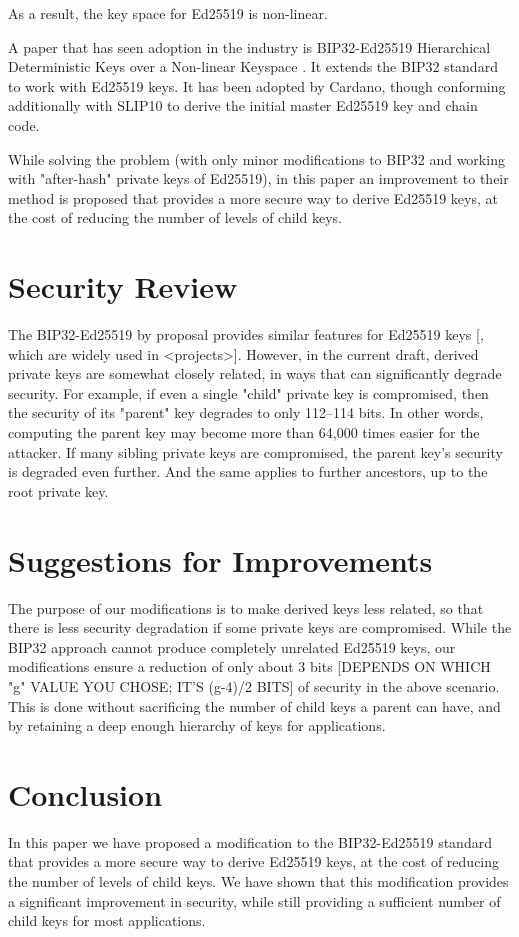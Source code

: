 \documentclass[12pt, a4paper, twocolumn]{article}
\begin{document}
As a result, the key space for Ed25519 is non-linear.

A paper that has seen adoption in the industry is BIP32-Ed25519
Hierarchical Deterministic Keys over a Non-linear Keyspace \cite{BIP32-Ed25519}. It extends the BIP32 standard to work with Ed25519 keys. It has been adopted by Cardano, though conforming additionally with SLIP10 to derive the initial master Ed25519 key and chain code.

While solving the problem (with only minor modifications to BIP32 and working with "after-hash" private keys of Ed25519), in this paper an improvement to their method is proposed that provides a more secure way to derive Ed25519 keys, at the cost of reducing the number of levels of child keys.


\section{Security Review}

The BIP32-Ed25519 by  proposal provides similar features for Ed25519 keys [, which are widely used in <projects>]. However, in the current draft, derived private keys are somewhat closely related, in ways that can significantly degrade security. For example, if even a single "child" private key is compromised, then the security of its "parent" key degrades to only 112--114 bits. In other words, computing the parent key may become more than 64,000 times easier for the attacker. If many sibling private keys are compromised, the parent key's security is degraded even further. And the same applies to further ancestors, up to the root private key.


\section{Suggestions for Improvements}

The purpose of our modifications is to make derived keys less related, so that there is less security degradation if some private keys are compromised. While the BIP32 approach cannot produce completely unrelated Ed25519 keys, our modifications ensure a reduction of only about 3 bits [DEPENDS ON WHICH "g" VALUE YOU CHOSE; IT'S (g-4)/2 BITS] of security in the above scenario. This is done without sacrificing the number of child keys a parent can have, and by retaining a deep enough hierarchy of keys for applications.

\section{Conclusion}

In this paper we have proposed a modification to the BIP32-Ed25519 standard that provides a more secure way to derive Ed25519 keys, at the cost of reducing the number of levels of child keys. We have shown that this modification provides a significant improvement in security, while still providing a sufficient number of child keys for most applications.


\nocite{*}


\end{document}
